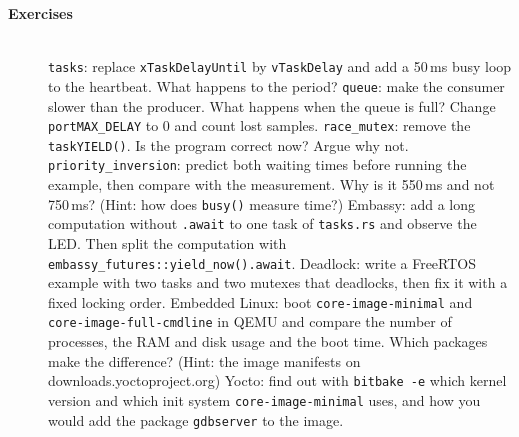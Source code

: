 \begin{description}
\item[{\rot\bf Exercises}]~\\[-\lblskip]
\bi
	\ite \texttt{tasks}: replace \texttt{xTaskDelayUntil} by \texttt{vTaskDelay} and add a 50\,ms busy loop to the heartbeat. What happens to the period?
	\ite \texttt{queue}: make the consumer slower than the producer. What happens when the queue is full? Change \texttt{portMAX\_DELAY} to 0 and count lost samples.
	\ite \texttt{race\_mutex}: remove the \texttt{taskYIELD()}. Is the program correct now? Argue why not.
	\ite \texttt{priority\_inversion}: predict both waiting times before running the example, then compare with the measurement. Why is it 550\,ms and not 750\,ms? (Hint: how does \texttt{busy()} measure time?)
	\ite Embassy: add a long computation without \texttt{.await} to one task of \texttt{tasks.rs} and observe the LED. Then split the computation with \texttt{embassy\_futures::yield\_now().await}.
	\ite Deadlock: write a FreeRTOS example with two tasks and two mutexes that deadlocks, then fix it with a fixed locking order.
	\ite Embedded Linux: boot \texttt{core-image-minimal} and \texttt{core-image-full-cmdline} in QEMU and compare the number of processes, the RAM and disk usage and the boot time. Which packages make the difference? (Hint: the image manifests on downloads.yoctoproject.org)
	\ite Yocto: find out with \texttt{bitbake -e} which kernel version and which init system \texttt{core-image-minimal} uses, and how you would add the package \texttt{gdbserver} to the image.
\ei
\end{description}
